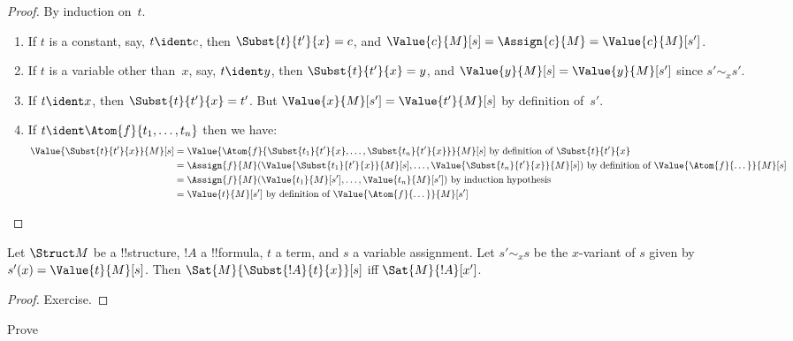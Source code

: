 \documentclass[../../include/open-logic-section]{subfiles}
\begin{document}
\begin{proof}
By induction on~$t$. 
\begin{enumerate}
\item If $t$ is a constant, say, $t\ident c$, then $\Subst{t}{t'}{x} =
  c$, and $\Value{c}{M}[s] = \Assign{c}{M} = \Value{c}{M}[s']$.

\item If $t$ is a variable other than~$x$, say, $t \ident y$, then
  $\Subst{t}{t'}{x} = y$, and $\Value{y}{M}[s] = \Value{y}{M}[s']$
  since $s' \sim_x s'$.

\item If $t \ident x$, then $\Subst{t}{t'}{x} = t'$.  But
  $\Value{x}{M}[s'] = \Value{t'}{M}[s]$ by definition of~$s'$.

\item If $t \ident \Atom{f}{t_1,\dots,t_n}$ then we have:
\begin{align*}
\Value{\Subst{t}{t'}{x}}{M}[s] & = 
\Value{\Atom{f}{\Subst{t_1}{t'}{x}, \dots, \Subst{t_n}{t'}{x}}}{M}[s]
    \text{ by definition of $\Subst{t}{t'}{x}$}\\
& = \Assign{f}{M}(\Value{\Subst{t_1}{t'}{x}}{M}[s], \dots, 
   \Value{\Subst{t_n}{t'}{x}}{M}[s]) 
    \text{ by definition of $\Value{\Atom{f}{\dots}}{M}[s]$}\\
& = \Assign{f}{M}(\Value{t_1}{M}[s'], \dots, 
   \Value{t_n}{M}[s']) 
    \text{ by induction hypothesis}\\
& = \Value{t}{M}[s']
    \text{ by definition of $\Value{\Atom{f}{\dots}}{M}[s']$}
\end{align*}
\end{enumerate}
\end{proof}

\begin{prop}
Let $\Struct M$ be a !!{structure}, $!A$ a !!{formula}, $t$ a term,
and $s$ a variable assignment. Let $s' \sim_x s$ be the $x$-variant of
$s$ given by~$s'(x) = \Value{t}{M}[s]$. Then
$\Sat{M}{\Subst{!A}{t}{x}}[s]$ iff $\Sat{M}{!A}[x']$.
\end{prop}

\begin{proof}
Exercise.
\end{proof}

\begin{prob}
Prove 
\end{prob}
\end{document}
